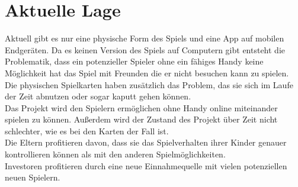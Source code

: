 \section{Aktuelle Lage}

Aktuell gibt es nur eine physische Form des Spiels und eine App auf mobilen Endgeräten. Da es keinen Version des Spiels auf Computern gibt entsteht die Problematik, dass ein potenzieller Spieler ohne ein fähiges Handy keine Möglichkeit hat das Spiel mit Freunden die er nicht besuchen kann zu spielen. Die physischen Spielkarten haben zusätzlich das Problem, das sie sich im Laufe der Zeit abnutzen oder sogar kaputt gehen können. \\Das Projekt wird den Spielern ermöglichen ohne Handy online miteinander spielen zu können. Außerdem wird der Zustand des Projekt über Zeit nicht schlechter, wie es bei den Karten der Fall ist.\\Die Eltern profitieren davon, dass sie das Spielverhalten ihrer Kinder genauer kontrollieren können als mit den anderen Spielmöglichkeiten. \\Investoren profitieren durch eine neue Einnahmequelle mit vielen potenziellen neuen Spielern.